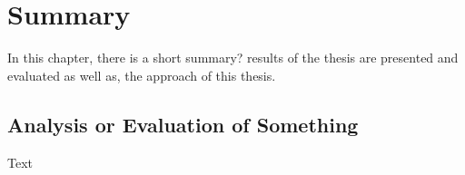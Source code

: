 \documentclass[class=scrbook, crop=false]{standalone}
\begin{document}
\chapter{Summary}
\label{Chapter::Summary}
    In this chapter, there is a short summary? results of the thesis are presented and evaluated as well as, the approach of this thesis.
\section{Analysis or Evaluation of Something}
\label{Section::Short Analysis or Evaluation of Something}    
    Text
\end{document}
